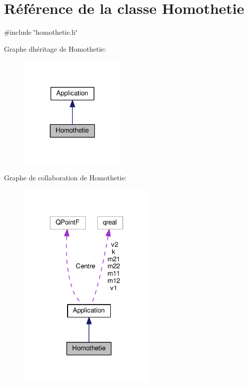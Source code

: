 \hypertarget{class_homothetie}{}\section{Référence de la classe Homothetie}
\label{class_homothetie}


{\ttfamily \#include \char`\"{}homothetie.\+h\char`\"{}}



Graphe d\textquotesingle{}héritage de Homothetie\+:\nopagebreak
\begin{figure}[H]
\begin{center}
\leavevmode
\includegraphics[width=147pt]{class_homothetie__inherit__graph}
\end{center}
\end{figure}


Graphe de collaboration de Homothetie\+:\nopagebreak
\begin{figure}[H]
\begin{center}
\leavevmode
\includegraphics[width=190pt]{class_homothetie__coll__graph}
\end{center}
\end{figure}
